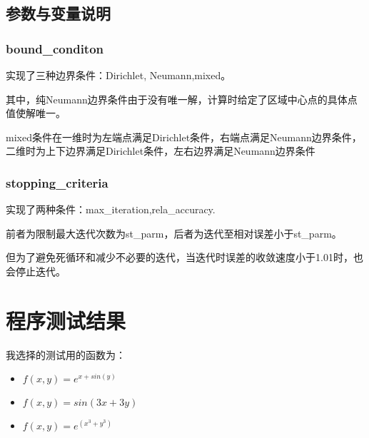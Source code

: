 \documentclass[12]{article}%
\begin{document}
\subsection{参数与变量说明}
\subsubsection{bound\_conditon}
实现了三种边界条件：Dirichlet, Neumann,mixed。

其中，纯Neumann边界条件由于没有唯一解，计算时给定了区域中心点的具体点值使解唯一。

mixed条件在一维时为左端点满足Dirichlet条件，右端点满足Neumann边界条件，二维时为上下边界满足Dirichlet条件，左右边界满足Neumann边界条件

\subsubsection{stopping\_criteria}
实现了两种条件：max\_iteration,rela\_accuracy.

前者为限制最大迭代次数为st\_parm，后者为迭代至相对误差小于st\_parm。

但为了避免死循环和减少不必要的迭代，当迭代时误差的收敛速度小于1.01时，也会停止迭代。
\section{程序测试结果}
我选择的测试用的函数为：
\begin{itemize}
    \item $f(x,y)=e^{x+sin(y)}$
    \item $f(x,y)=sin(3x+3y)$
    \item $f(x,y)=e^(x^3+y^3)$
\end{itemize}
\end{document}
